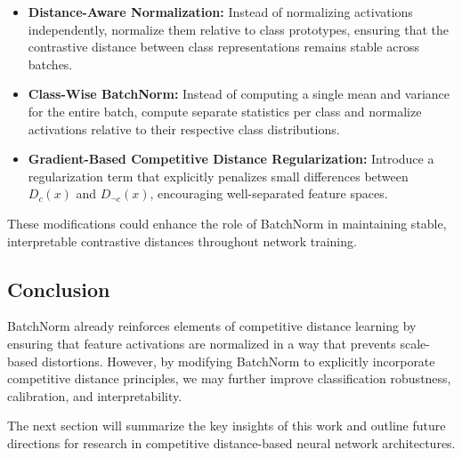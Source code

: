\begin{itemize}
    \item \textbf{Distance-Aware Normalization:} Instead of normalizing activations independently, normalize them relative to class prototypes, ensuring that the contrastive distance between class representations remains stable across batches.
    \item \textbf{Class-Wise BatchNorm:} Instead of computing a single mean and variance for the entire batch, compute separate statistics per class and normalize activations relative to their respective class distributions.
    \item \textbf{Gradient-Based Competitive Distance Regularization:} Introduce a regularization term that explicitly penalizes small differences between \( D_c(x) \) and \( D_{\neg c}(x) \), encouraging well-separated feature spaces.
\end{itemize}

These modifications could enhance the role of BatchNorm in maintaining stable, interpretable contrastive distances throughout network training.

\subsection{Conclusion}

BatchNorm already reinforces elements of competitive distance learning by ensuring that feature activations are normalized in a way that prevents scale-based distortions. However, by modifying BatchNorm to explicitly incorporate competitive distance principles, we may further improve classification robustness, calibration, and interpretability. 

The next section will summarize the key insights of this work and outline future directions for research in competitive distance-based neural network architectures.
